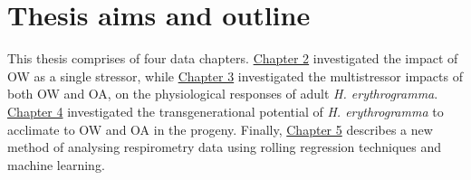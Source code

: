 \documentclass[a4paper,10pt, oneside]{memoir}
\begin{document}
\hypertarget{thesis-aims-and-outline}{%
\section{Thesis aims and outline}\label{thesis-aims-and-outline}}

This thesis comprises of four data chapters. \protect\hyperlink{warming}{Chapter 2} investigated the impact of OW as a single stressor, while \protect\hyperlink{multistressor}{Chapter 3} investigated the multistressor impacts of both OW and OA, on the physiological responses of adult \emph{H. erythrogramma}.
\protect\hyperlink{transgen}{Chapter 4} investigated the transgenerational potential of \emph{H. erythrogramma} to acclimate to OW and OA in the progeny.
Finally, \protect\hyperlink{package}{Chapter 5} describes a new method of analysing respirometry data using rolling regression techniques and machine learning.
\end{document}
